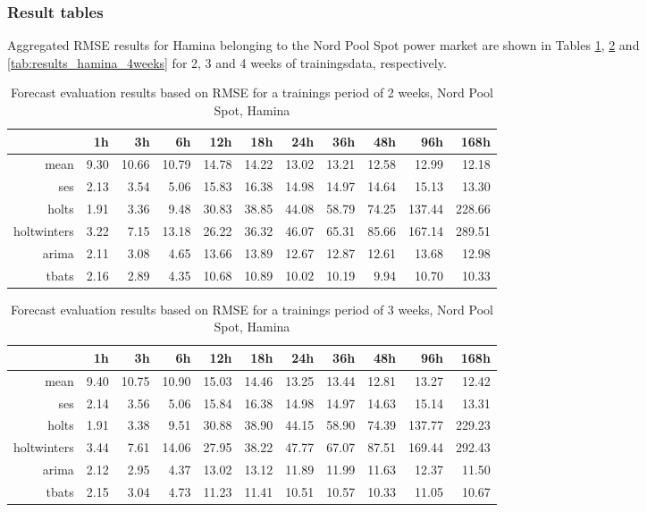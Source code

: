 \subsubsection{Result tables} \label{sssec:result_tables}

Aggregated RMSE results for Hamina belonging to the Nord Pool Spot power market are shown in Tables \ref{tab:results_hamina_2weeks}, \ref{tab:results_hamina_3weeks} and \ref{tab:results_hamina_4weeks} for 2, 3 and 4 weeks of trainingsdata, respectively. 


\begin{table}[ht]
\centering
\begin{tabular}{rrrrrrrrrrr}
  \hline
 & 1h & 3h & 6h & 12h & 18h & 24h & 36h & 48h & 96h & 168h \\ 
  \hline
mean & 9.30 & 10.66 & 10.79 & 14.78 & 14.22 & 13.02 & 13.21 & 12.58 & 12.99 & 12.18 \\ 
  ses & 2.13 & 3.54 & 5.06 & 15.83 & 16.38 & 14.98 & 14.97 & 14.64 & 15.13 & 13.30 \\ 
  holts & 1.91 & 3.36 & 9.48 & 30.83 & 38.85 & 44.08 & 58.79 & 74.25 & 137.44 & 228.66 \\ 
  holtwinters & 3.22 & 7.15 & 13.18 & 26.22 & 36.32 & 46.07 & 65.31 & 85.66 & 167.14 & 289.51 \\ 
  arima & 2.11 & 3.08 & 4.65 & 13.66 & 13.89 & 12.67 & 12.87 & 12.61 & 13.68 & 12.98 \\ 
  tbats & 2.16 & 2.89 & 4.35 & 10.68 & 10.89 & 10.02 & 10.19 & 9.94 & 10.70 & 10.33 \\ 
   \hline
\end{tabular}
\caption{Forecast evaluation results based on RMSE for a trainings period of 2 weeks, Nord Pool Spot, Hamina}
\label{tab:results_hamina_2weeks}
\end{table}
\begin{table}[ht]
\centering
\begin{tabular}{rrrrrrrrrrr}
  \hline
 & 1h & 3h & 6h & 12h & 18h & 24h & 36h & 48h & 96h & 168h \\ 
  \hline
mean & 9.40 & 10.75 & 10.90 & 15.03 & 14.46 & 13.25 & 13.44 & 12.81 & 13.27 & 12.42 \\ 
  ses & 2.14 & 3.56 & 5.06 & 15.84 & 16.38 & 14.98 & 14.97 & 14.63 & 15.14 & 13.31 \\ 
  holts & 1.91 & 3.38 & 9.51 & 30.88 & 38.90 & 44.15 & 58.90 & 74.39 & 137.77 & 229.23 \\ 
  holtwinters & 3.44 & 7.61 & 14.06 & 27.95 & 38.22 & 47.77 & 67.07 & 87.51 & 169.44 & 292.43 \\ 
  arima & 2.12 & 2.95 & 4.37 & 13.02 & 13.12 & 11.89 & 11.99 & 11.63 & 12.37 & 11.50 \\ 
  tbats & 2.15 & 3.04 & 4.73 & 11.23 & 11.41 & 10.51 & 10.57 & 10.33 & 11.05 & 10.67 \\ 
   \hline
\end{tabular}
\caption{Forecast evaluation results based on RMSE for a trainings period of 3 weeks, Nord Pool Spot, Hamina}
\label{tab:results_hamina_3weeks}
\end{table}
